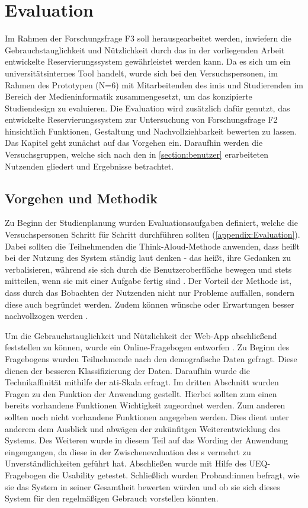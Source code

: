 
\chapter{Evaluation}
\label{chapter-evaluation}
Im Rahmen der Forschungsfrage F3 soll herausgearbeitet werden, inwiefern die
Gebrauchstauglichkeit und Nützlichkeit durch das in der vorliegenden Arbeit
entwickelte Reservierungssystem gewährleistet werden kann. Da es sich um ein
universitätsinternes Tool handelt, wurde sich bei den Versuchspersonen, im
Rahmen des Prototypen (N=6) mit Mitarbeitenden des \ac{imis} und Studierenden im
Bereich der Medieninformatik zusammengesetzt, um das konzipierte Studiendesign
zu evaluieren. Die Evaluation wird zusätzlich dafür genutzt, das entwickelte
Reservierungssystem zur Untersuchung von Forschungsfrage F2 hinsichtlich
Funktionen, Gestaltung und Nachvollziehbarkeit bewerten zu lassen. Das Kapitel
geht zunächst auf das Vorgehen ein. Daraufhin werden die Versuchsgruppen, welche
sich nach den in \ref{section:benutzer} erarbeiteten Nutzenden gliedert und
Ergebnisse betrachtet.


\section{Vorgehen und Methodik}
Zu Beginn der Studienplanung wurden Evaluationsaufgaben definiert, welche die
Versuchspersonen Schritt für Schritt durchführen sollten (\ref{appendix:Evaluation}). Dabei sollten die
Teilnehmenden die Think-Aloud-Methode anwenden, dass heißt bei der Nutzung des
System ständig laut denken - das heißt, ihre Gedanken zu verbalisieren, während
sie sich durch die Benutzeroberfläche bewegen und stets mitteilen, wenn sie mit
einer Aufgabe fertig sind \cite{nielsen_usability_1994}. Der Vorteil der Methode
ist, dass durch das Bobachten der Nutzenden nicht nur Probleme auffallen,
sondern diese auch begründet werden. Zudem können wünsche oder  Erwartungen
besser nachvollzogen werden \cite{nielsen_think}.

Um die Gebrauchstauglichkeit und Nützlichkeit der Web-App abschließend
feststellen zu können, wurde ein Online-Fragebogen entworfen . Zu
Beginn des Fragebogens wurden Teilnehmende nach den demografische Daten gefragt.
Diese dienen der besseren Klassifizierung der Daten. Daraufhin wurde die
Technikaffinität mithilfe der \ac{ati}-Skala erfragt. Im dritten Abschnitt
wurden Fragen zu den Funktion der Anwendung gestellt. Hierbei sollten zum einen
bereits vorhandene Funktionen Wichtigkeit zugeordnet werden. Zum anderen sollten
noch nicht vorhandene Funktionen angegeben werden. Dies dient unter anderem dem
Ausblick und abwägen der zukünfitgen Weiterentwicklung des Systems. Des Weiteren
wurde in diesem Teil auf das Wording der Anwendung eingengangen, da diese in der
Zwischenevaluation des s  vermehrt zu
Unverständlichkeiten geführt hat. Abschließen wurde mit Hilfe des UEQ-Fragebogen
die Usability getestet. Schließlich wurden Proband:innen befragt, wie sie das
System in seiner Gesamtheit bewerten würden und ob sie sich dieses System für
den regelmäßigen Gebrauch vorstellen könnten.




